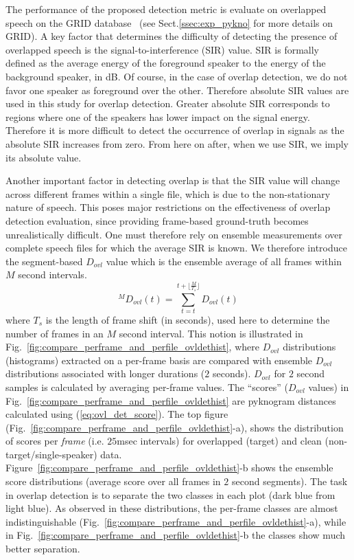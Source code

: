 {The performance of the proposed detection metric is evaluate on overlapped speech on the GRID database~\cite{SSC_link} (see Sect.\ref{ssec:exp_pykno} for more details on GRID). 
A key factor that determines the difficulty of detecting the presence of overlapped speech is the signal-to-interference (SIR) value. 
SIR is formally defined as the average energy of the foreground speaker to the energy of the background speaker, in dB. 
Of course, in the case of overlap detection, we do not favor one speaker as foreground over the other. 
Therefore absolute SIR values are used in this study for overlap detection. 
Greater absolute SIR corresponds to regions where one of the speakers has lower impact on the signal energy. 
Therefore it is more difficult to detect the occurrence of overlap in signals as the absolute SIR increases from zero.  
From here on after, when we use SIR, we imply its absolute value. 

Another important factor in detecting overlap is that the SIR value will change across different frames within a single file, which is due to the non-stationary nature of speech. 
This poses major restrictions on the effectiveness of overlap detection evaluation, since providing frame-based ground-truth becomes unrealistically difficult. 
One must therefore rely on ensemble measurements over complete speech files for which the average SIR is known. 
We therefore introduce the segment-based $D_{ovl}$ value which is the ensemble average of all frames within $M$ second intervals. 
\begin{equation}
\label{eq:seg_dovl}
^{M}D_{ovl}(t) = \sum_{t = t}^{t+\lfloor \frac{M}{T_s} \rfloor} D_{ovl}(t)
\end{equation}
where $T_s$ is the length of frame shift (in seconds), used here to determine the number of frames in an $M$ second interval. 
This notion is illustrated in Fig.~\ref{fig:compare_perframe_and_perfile_ovldethist}, where $D_{ovl}$ distributions (histograms) extracted on a per-frame basis are compared with ensemble $D_{ovl}$ distributions associated with longer durations ($2$ seconds). 
$D_{ovl}$ for $2$ second samples is calculated by averaging per-frame values. 
The ``scores'' ($D_{ovl}$ values) in Fig.~\ref{fig:compare_perframe_and_perfile_ovldethist} are pyknogram distances calculated using (\ref{eq:ovl_det_score}). 
The top figure (Fig.~\ref{fig:compare_perframe_and_perfile_ovldethist}-a), shows the distribution of scores per {\it frame} (i.e. $25$msec intervals) for overlapped (target) and clean (non-target/single-speaker) data.  
Figure~\ref{fig:compare_perframe_and_perfile_ovldethist}-b shows the ensemble score distributions (average score over all frames in $2$ second segments). 
The task in overlap detection is to separate the two classes in each plot (dark blue from light blue). 
As observed in these distributions, the per-frame classes are almost indistinguishable (Fig.~\ref{fig:compare_perframe_and_perfile_ovldethist}-a), while in Fig.~\ref{fig:compare_perframe_and_perfile_ovldethist}-b the classes show much better separation. 


}
